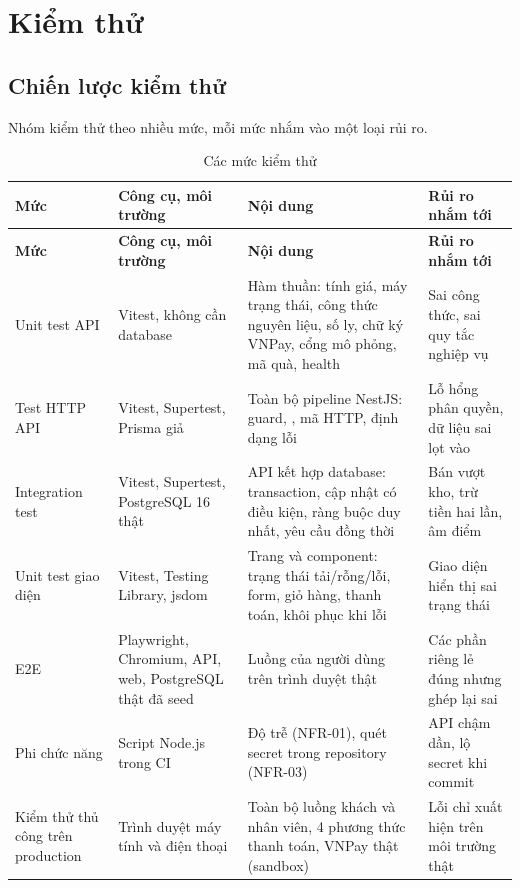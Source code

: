 \section{Kiểm thử}\label{ch:kiemthu}

\subsection{Chiến lược kiểm thử}
Nhóm kiểm thử theo nhiều mức, mỗi mức nhắm vào một loại rủi ro.

\begin{longtable}{@{}L{2.7cm}L{3.4cm}L{4.7cm}L{3cm}@{}}
\caption{Các mức kiểm thử}\label{tab:mucktest}\\
\toprule
\textbf{Mức} & \textbf{Công cụ, môi trường} & \textbf{Nội dung} & \textbf{Rủi ro nhắm tới} \\ \midrule \endfirsthead
\toprule \textbf{Mức} & \textbf{Công cụ, môi trường} & \textbf{Nội dung} & \textbf{Rủi ro nhắm tới} \\ \midrule \endhead
\bottomrule \endfoot
Unit test API & Vitest, không cần database & Hàm thuần: tính giá, máy trạng thái, công thức nguyên liệu, số ly, chữ ký VNPay, cổng mô phỏng, mã quà, health & Sai công thức, sai quy tắc nghiệp vụ \\
Test HTTP API & Vitest, Supertest, Prisma giả & Toàn bộ pipeline NestJS: guard, , mã HTTP, định dạng lỗi & Lỗ hổng phân quyền, dữ liệu sai lọt vào \\
Integration test & Vitest, Supertest, PostgreSQL 16 thật & API kết hợp database: transaction, cập nhật có điều kiện, ràng buộc duy nhất, yêu cầu đồng thời & Bán vượt kho, trừ tiền hai lần, âm điểm \\
Unit test giao diện & Vitest, Testing Library, jsdom & Trang và component: trạng thái tải/rỗng/lỗi, form, giỏ hàng, thanh toán, khôi phục khi lỗi & Giao diện hiển thị sai trạng thái \\
E2E & Playwright, Chromium, API, web, PostgreSQL thật đã seed & Luồng của người dùng trên trình duyệt thật & Các phần riêng lẻ đúng nhưng ghép lại sai \\
Phi chức năng & Script Node.js trong CI & Độ trễ  (NFR-01), quét secret trong repository (NFR-03) & API chậm dần, lộ secret khi commit \\
Kiểm thử thủ công trên production & Trình duyệt máy tính và điện thoại & Toàn bộ luồng khách và nhân viên, 4 phương thức thanh toán, VNPay thật (sandbox) & Lỗi chỉ xuất hiện trên môi trường thật \\
\end{longtable}

